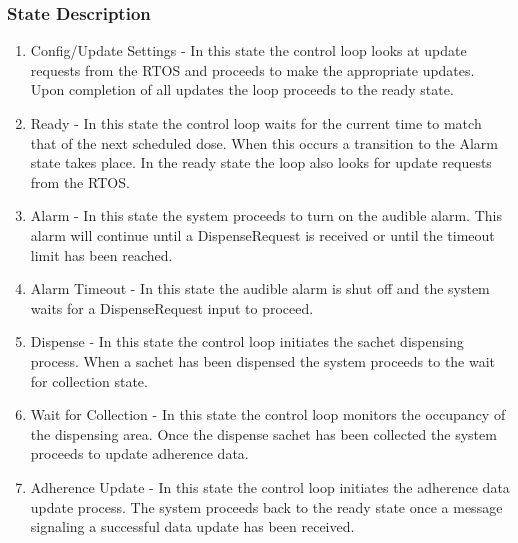\documentclass[12pt,titlepage]{article}
\begin{document}
\pagebreak

\subsubsection*{State Description}
\begin{enumerate}
    \item Config/Update Settings - In this state the control loop looks at update requests from the RTOS and proceeds to make the appropriate updates. Upon completion of all updates the loop proceeds to the ready state.
    \item Ready - In this state the control loop waits for the current time to match that of the next scheduled dose. When this occurs a transition to the Alarm state takes place. In the ready state the loop also looks for update requests from the RTOS.
    \item Alarm - In this state the system proceeds to turn on the audible alarm. This alarm will continue until a DispenseRequest is received or until the timeout limit has been reached.
    \item Alarm Timeout - In this state the audible alarm is shut off and the system waits for a DispenseRequest input to proceed.
    \item Dispense - In this state the control loop initiates the sachet dispensing process. When a sachet has been dispensed the system proceeds to the wait for collection state.
    \item Wait for Collection - In this state the control loop monitors the occupancy of the dispensing area. Once the dispense sachet has been collected the system proceeds to update adherence data.
    \item Adherence Update - In this state the control loop initiates the adherence data update process. The system proceeds back to the ready state once a message signaling a successful data update has been received.
\end{enumerate}

\end{document}

